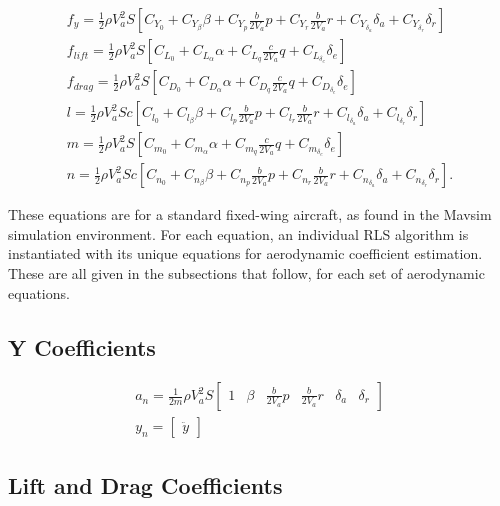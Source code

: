 \begin{align*}
    f_y = \frac{1}{2} \rho V_a^2 S \left[ C_{Y_0} + C_{Y_\beta} \beta + C_{Y_p} \frac{b}{2 V_a} p + C_{Y_r} \frac{b}{2 V_a} r + C_{Y_{\delta_a}} \delta_a + C_{Y_{\delta_r}} \delta_r\right]\\
    f_{lift} = \frac{1}{2} \rho V_a^2 S \left[C_{L_0} + C_{L_\alpha} \alpha + C_{L_q} \frac{c}{2 V_a} q + C_{L_{\delta_e}} \delta_e \right]\\
    f_{drag} = \frac{1}{2} \rho V_a^2 S \left[C_{D_0} + C_{D_\alpha} \alpha + C_{D_q} \frac{c}{2 V_a} q + C_{D_{\delta_e}} \delta_e \right]\\
    l = \frac{1}{2} \rho V_a^2 S c \left[ C_{l_0} + C_{l_\beta} \beta + C_{l_p} \frac{b}{2 V_a} p + C_{l_r} \frac{b}{2 V_a} r + C_{l_{\delta_a}} \delta_a + C_{l_{\delta_r}} \delta_r\right]\\
    m = \frac{1}{2} \rho V_a^2 S \left[C_{m_0} + C_{m_\alpha} \alpha + C_{m_q} \frac{c}{2 V_a} q + C_{m_{\delta_e}} \delta_e \right]\\
    n = \frac{1}{2} \rho V_a^2 S c \left[C_{n_0} + C_{n_\beta} \beta + C_{n_p} \frac{b}{2 V_a} p + C_{n_r} \frac{b}{2 V_a} r + C_{n_{\delta_a}} \delta_a + C_{n_{\delta_r}} \delta_r\right].
\end{align*}

These equations are for a standard fixed-wing aircraft, as found in the Mavsim simulation environment.
For each equation, an individual RLS algorithm is instantiated with its unique equations for aerodynamic coefficient estimation.
These are all given in the subsections that follow, for each set of aerodynamic equations.

\subsection{Y Coefficients}

\begin{align*}
    a_n = \frac{1}{2m} \rho V_a^2 S
    \begin{bmatrix}
        1 & \beta & \frac{b}{2V_a}p & \frac{b}{2V_a}r & \delta_a & \delta_r
    \end{bmatrix}\\
    y_n =
    \begin{bmatrix}
        \ddot{y}
    \end{bmatrix}
\end{align*}

\subsection{Lift and Drag Coefficients}

